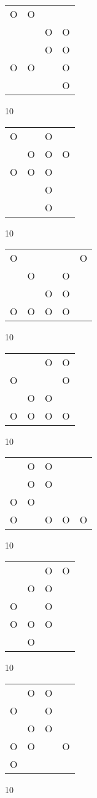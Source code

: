 \begin{tabular}{|m{0.2cm}m{0.2cm}m{0.2cm}m{0.2cm}|}\hline
O&O& & \\
 & &O&O\\
 & &O&O\\
O&O& &O\\
 & & &O\\
\hline\end{tabular}10
\begin{tabular}{|m{0.2cm}m{0.2cm}m{0.2cm}m{0.2cm}|}\hline
O& &O& \\
 &O&O&O\\
O&O&O& \\
 & &O& \\
 & &O& \\
\hline\end{tabular}10
\begin{tabular}{|m{0.2cm}m{0.2cm}m{0.2cm}m{0.2cm}m{0.2cm}|}\hline
O& & & &O\\
 &O& &O& \\
 & &O&O& \\
O&O&O&O& \\
\hline\end{tabular}10
\begin{tabular}{|m{0.2cm}m{0.2cm}m{0.2cm}m{0.2cm}|}\hline
 & &O&O\\
O& & &O\\
 &O&O& \\
O&O&O&O\\
\hline\end{tabular}10
\begin{tabular}{|m{0.2cm}m{0.2cm}m{0.2cm}m{0.2cm}m{0.2cm}|}\hline
 &O&O& & \\
 &O&O& & \\
O&O& & & \\
O& &O&O&O\\
\hline\end{tabular}10
\begin{tabular}{|m{0.2cm}m{0.2cm}m{0.2cm}m{0.2cm}|}\hline
 & &O&O\\
 &O&O& \\
O& &O& \\
O&O&O& \\
 &O& & \\
\hline\end{tabular}10
\begin{tabular}{|m{0.2cm}m{0.2cm}m{0.2cm}m{0.2cm}|}\hline
 &O&O& \\
O& &O& \\
 &O&O& \\
O&O& &O\\
O& & & \\
\hline\end{tabular}10
